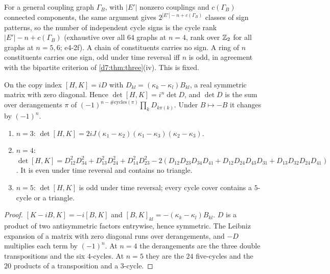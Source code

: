 \begin{remark}
\label{e4:rem:graphs}
For a general coupling graph $\Gamma_B$, with $|E'|$ nonzero couplings and $c(\Gamma_B)$ connected components, the same argument gives
$2^{|E'|-n+c(\Gamma_B)}$ classes of sign patterns, so the number of independent cycle signs is the cycle rank $|E'|-n+c(\Gamma_B)$ (exhaustive over all
$64$ graphs at $n=4$, rank over $\mathbb{Z}_2$ for all graphs at $n=5,6$; e4-2f). A chain of constituents carries no sign. A ring of $n$ constituents
carries one sign, odd under time reversal iff $n$ is odd, in agreement with the bipartite criterion of \cref{d7:thm:three}(iv). This is fixed.
\end{remark}

\begin{proposition}
\label{e4:prop:jarlskog}
On the copy index $[H,K]=iD$ with $D_{kl}=(\kappa_k-\kappa_l)B_{kl}$, a real symmetric matrix with zero diagonal. Hence $\det[H,K]=i^n\det D$, and
$\det D$ is the sum over derangements $\pi$ of $(-1)^{n-\#\text{cycles}(\pi)}\prod_kD_{k\pi(k)}$. Under $B\mapsto-B$ it changes by $(-1)^n$.
\begin{enumerate}[label=(\roman*),leftmargin=2.2em]
\item $n=3$: $\det[H,K]=2iJ(\kappa_1-\kappa_2)(\kappa_1-\kappa_3)(\kappa_2-\kappa_3)$.
\item $n=4$: $\det[H,K]=D_{12}^2D_{34}^2+D_{13}^2D_{24}^2+D_{14}^2D_{23}^2-2(D_{12}D_{23}D_{34}D_{41}+D_{12}D_{24}D_{43}D_{31}+D_{13}D_{32}D_{24}D_{41})$. It is even
under time reversal and contains no triangle.
\item $n=5$: $\det[H,K]$ is odd under time reversal; every cycle cover contains a $5$-cycle or a triangle.
\end{enumerate}
\end{proposition}

\begin{proof}
$[K-iB,K]=-i[B,K]$ and $[B,K]_{kl}=-(\kappa_k-\kappa_l)B_{kl}$. $D$ is a product of two antisymmetric factors entrywise, hence symmetric. The Leibniz
expansion of a matrix with zero diagonal runs over derangements, and $-D$ multiplies each term by $(-1)^n$. At $n=4$ the derangements are the three
double transpositions and the six $4$-cycles. At $n=5$ they are the $24$ five-cycles and the $20$ products of a transposition and a $3$-cycle.
\end{proof}

